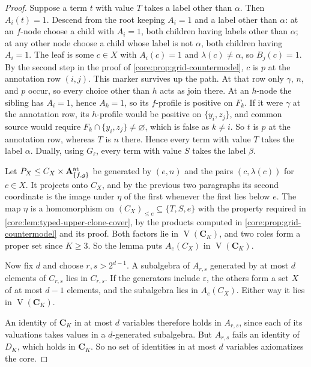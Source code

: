 \begin{proof}
Suppose a term $t$ with value $T$ takes a label other than $\alpha$. Then
$A_i(t)=1$. Descend from the root keeping $A_i=1$ and a label other than
$\alpha$: at an $f$-node choose a child with $A_i=1$, both children having
labels other than $\alpha$; at any other node choose a child whose label is
not $\alpha$, both children having $A_i=1$. The leaf is some $c\in X$ with
$A_i(c)=1$ and $\lambda(c)\ne\alpha$, so $B_j(c)=1$. By the second step in
the proof of \cref{core:prop:grid-countermodel}, $c$ is $p$ at the
annotation row $(i,j)$. This marker survives up the path. At that row only
$\gamma$, $n$, and $p$ occur, so every choice other than $h$ acts as join
there. At an $h$-node the sibling has $A_i=1$, hence $A_k=1$, so its
$f$-profile is positive on $F_k$. If it were $\gamma$ at the annotation row,
its $h$-profile would be positive on $\{y_i,z_j\}$, and common source would
require $F_k\cap\{y_i,z_j\}\ne\varnothing$, which is false as $k\ne i$. So
$t$ is $p$ at the annotation row, whereas $T$ is $n$ there. Hence every
term with value $T$ takes the label $\alpha$. Dually, using $G_\ell$, every
term with value $S$ takes the label $\beta$.

Let $P_X\leq C_X\times\mathbf A^{\rm at}_{\{f,g\}}$ be generated by $(e,n)$
and the pairs $(c,\lambda(c))$ for $c\in X$. It projects onto $C_X$, and by
the previous two paragraphs its second coordinate is the image under $\eta$
of the first whenever the first lies below $e$. The map $\eta$ is a
homomorphism on $(C_X)_{\leq e}\subseteq\{T,S,e\}$ with the property
required in \cref{core:lem:typed-upper-clone-cover}, by the products
computed in \cref{core:prop:grid-countermodel} and its proof. Both factors lie in
$\operatorname V(\mathbf C_K)$, and two roles form a proper set since
$K\geq3$. So the lemma puts $A_e(C_X)$ in $\operatorname V(\mathbf C_K)$.

Now fix $d$ and choose $r,s>2^{d-1}$. A subalgebra of $A_{r,s}$ generated
by at most $d$ elements of $C_{r,s}$ lies in $C_{r,s}$. If the generators
include $\varepsilon$, the others form a set $X$ of at most $d-1$ elements,
and the subalgebra lies in $A_e(C_X)$. Either way it lies in
$\operatorname V(\mathbf C_K)$.

An identity of $\mathbf C_K$ in at most $d$ variables therefore holds in
$A_{r,s}$, since each of its valuations takes values in a $d$-generated
subalgebra. But $A_{r,s}$ fails an identity of $D_K$, which holds in
$\mathbf C_K$. So no set of identities in at most $d$ variables axiomatizes
the core.
\end{proof}

